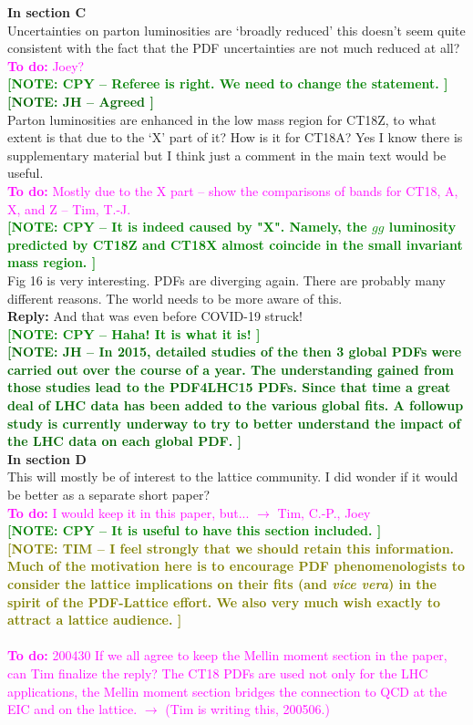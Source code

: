 \documentclass[aps,prd,amsmath,nofootinbib,floatfix,fleqn]{revtex4}
\newcommand{\TODO}[1]{\textcolor{magenta}{
\quad\vspace{3pt} \\ {\bf To do:} #1 \\
}}
\newcommand{\REPLY}[1]{\textcolor{redish}{\quad \\
{\bf Reply:} #1 \\
}}
\newcommand{\NOTECPY}[1]{\textcolor{green}{ \bf[NOTE: CPY -- #1 ]}}
\newcommand{\NOTEJH}[1]{\textcolor{darkgreen}{ \bf[NOTE: JH -- #1 ]}}
\newcommand{\NOTETIM}[1]{\textcolor{olive}{ \bf[NOTE: TIM -- #1 ]}}
\begin{document}
\noindent
{\bf In section C}\\
Uncertainties on parton luminosities are ‘broadly reduced’ this doesn’t seem quite consistent with the fact that the PDF uncertainties are not much reduced at all?
\TODO{Joey?}
\NOTECPY{Referee is right. We need to change the statement.}\\
\NOTEJH{Agreed}\\

\noindent
Parton luminosities are enhanced in the low mass region for CT18Z, to what extent is that due to the ‘X’ part of it? How is it for CT18A? Yes I know there is supplementary material but I think just a comment in the main text would be useful. \TODO{Mostly due to the X part -- show the comparisons of bands for CT18, A, X, and Z -- Tim, T.-J.}
\NOTECPY{It is indeed caused by "X". Namely, the $gg$ luminosity predicted by CT18Z and CT18X almost coincide in the small invariant mass region.}\\


\noindent
Fig 16 is very interesting. PDFs are diverging again. There are probably many different reasons. The world needs to be more aware of this.
\REPLY{And that was even before COVID-19 struck!}
\NOTECPY{Haha! It is what it is!}\\
\NOTEJH{In 2015, detailed studies of the then 3 global PDFs were carried out over the course of a year. The understanding gained from those studies lead to the PDF4LHC15 PDFs. Since that time a great deal of LHC data has been added to the various global fits. A followup study is currently underway to try to better understand the impact of the LHC data on each global PDF.}\\


\noindent
{\bf In section D}\\
This will mostly be of interest to the lattice community. I did wonder if it would be better as a
separate short paper?
\TODO{I would keep it in this paper, but... $\to$ Tim, C.-P., Joey}
\NOTECPY{It is useful to have this section included.}\\
\NOTETIM{I feel strongly that we should retain this information.  Much of the motivation
here is to encourage PDF phenomenologists to consider the lattice implications on their
fits (and {\it vice vera}) in the spirit of the PDF-Lattice effort.  We also very much
wish exactly to attract a lattice audience.}\\
\TODO{200430 If we all agree to keep the Mellin moment section in the paper, can Tim finalize the reply? The CT18 PDFs are used not only for the LHC applications, the Mellin moment section bridges the connection to QCD at the EIC and on the lattice. $\to$ (Tim is writing this, 200506.)}
\end{document}
